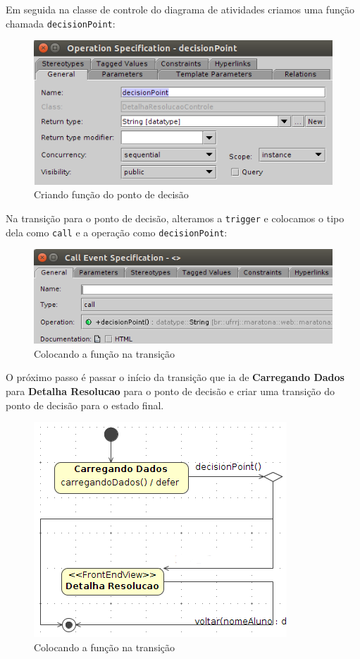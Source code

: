 Em seguida na classe de controle do diagrama de atividades criamos uma função
chamada \texttt{decisionPoint}:

\begin{figure}[H]
	\centering
	\includegraphics[scale=0.75]{files/imgs/decision-point-02.png}
	\caption{Criando função do ponto de decisão}
	\label{funcao_ponto_decisao}
\end{figure}

Na transição para o ponto de decisão, alteramos a \texttt{trigger} e colocamos o
tipo dela como \texttt{call} e a operação como \texttt{decisionPoint}:

\begin{figure}[H]
	\centering
	\includegraphics[scale=0.75]{files/imgs/decision-point-03.png}
	\caption{Colocando a função na transição}
	\label{funcao_transicao}
\end{figure}

O próximo passo é passar o início da transição que ia de \textbf{Carregando
Dados} para \textbf{Detalha Resolucao} para o ponto de decisão e criar uma
transição do ponto de decisão para o estado final.

\begin{figure}[H]
	\centering
	\includegraphics[scale=0.75]{files/imgs/decision-point-04.png}
	\caption{Colocando a função na transição}
	\label{ponto_decisao_com_transicoes}
\end{figure}

